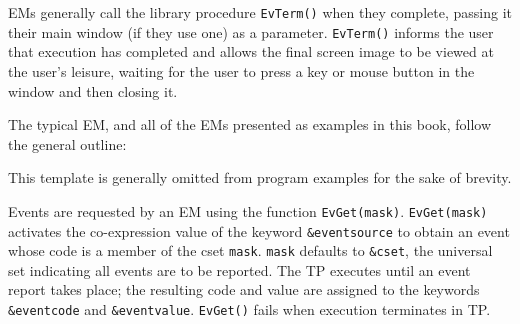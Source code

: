 EMs generally call the library procedure {\tt EvTerm()} when they complete,
passing it their main window (if they use one) as a parameter.
{\tt EvTerm()} informs the user that execution has completed and allows the
final screen image to be viewed at the user's leisure, waiting for the user to
press a key or mouse button in the window and then closing it.

The typical EM, and all of the EMs presented as examples in this
book, follow the general outline:
 

{}
\noindent This template is generally omitted from program examples for
the sake of brevity.

\vspace{1pc}


\vspace{0.25pc}
Events are requested by an EM using the function {\tt EvGet(mask)}.
{\tt EvGet(mask)} activates the co-expression value of the keyword 
{\tt \&eventsource} to obtain an event whose code is a member of the
cset {\tt mask}.
{\tt mask} defaults to {\tt \&cset}, the universal set indicating all events
are to be reported.
The TP executes until an event report takes place; the resulting code and
value are assigned to the keywords {\tt \&eventcode} and {\tt \&eventvalue}.
{\tt EvGet()} fails when execution terminates in TP.

\vspace{1pc}

